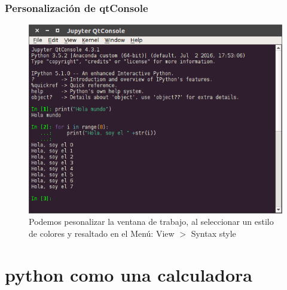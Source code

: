 {\begin{frame}
\frametitle{Personalización de qtConsole}
\begin{figure}
	\centering
	\includegraphics[scale=0.35]{qtConsole_02}
	\caption{Podemos pesonalizar la ventana de trabajo, al seleccionar un estilo de colores y resaltado en el Menú: View $>$ Syntax style}
\end{figure}
\end{frame}
\section{python como una calculadora}
}
